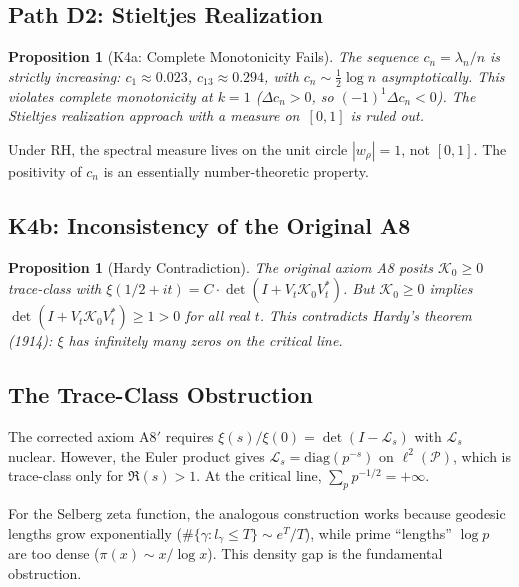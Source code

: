\documentclass[12pt,a4paper]{article}
\newtheorem{proposition}[theorem]{Proposition}
\theoremstyle{definition}
\theoremstyle{remark}
\newcommand{\PP}{\mathcal{P}}
\begin{document}
\subsection{Path D2: Stieltjes Realization}

\begin{proposition}[K4a: Complete Monotonicity Fails]
The sequence $c_n = \lambda_n/n$ is \emph{strictly increasing}: $c_1 \approx 0.023$, $c_{13} \approx 0.294$, with $c_n \sim \frac{1}{2}\log n$ asymptotically. This violates complete monotonicity at $k = 1$ ($\Delta c_n > 0$, so $(-1)^1\Delta c_n < 0$). The Stieltjes realization approach with a measure on~$[0,1]$ is ruled out.
\end{proposition}

Under RH, the spectral measure lives on the unit circle $|w_\rho| = 1$, not $[0,1]$. The positivity of $c_n$ is an essentially number-theoretic property.

\subsection{K4b: Inconsistency of the Original A8}

\begin{proposition}[Hardy Contradiction]
The original axiom A8 posits $\mathcal{K}_0 \geq 0$ trace-class with $\xi(1/2+it) = C\cdot\det(I + V_t\mathcal{K}_0V_t^*)$. But $\mathcal{K}_0 \geq 0$ implies $\det(I + V_t\mathcal{K}_0V_t^*) \geq 1 > 0$ for all real $t$. This contradicts Hardy's theorem (1914): $\xi$ has infinitely many zeros on the critical line.
\end{proposition}

\subsection{The Trace-Class Obstruction}

The corrected axiom A8$'$ requires $\xi(s)/\xi(0) = \det(I - \mathcal{L}_s)$ with $\mathcal{L}_s$ nuclear. However, the Euler product gives $\mathcal{L}_s = \mathrm{diag}(p^{-s})$ on $\ell^2(\PP)$, which is trace-class only for $\Re(s) > 1$. At the critical line, $\sum_p p^{-1/2} = +\infty$.

For the Selberg zeta function, the analogous construction works because geodesic lengths grow exponentially ($\#\{\gamma: l_\gamma \leq T\} \sim e^T/T$), while prime ``lengths'' $\log p$ are too dense ($\pi(x) \sim x/\log x$). This density gap is the fundamental obstruction.
\end{document}
